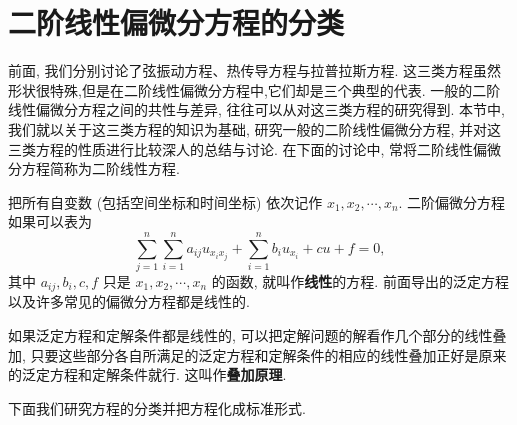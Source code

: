 \section{二阶线性偏微分方程的分类}
前面, 我们分别讨论了弦振动方程、热传导方程与拉普拉斯方程.
这三类方程虽然形状很特殊,但是在二阶线性偏微分方程中,它们却是三个典型的代表.
一般的二阶线性偏微分方程之间的共性与差异, 往往可以从对这三类方程的研究得到.
本节中, 我们就以关于这三类方程的知识为基础, 
研究一般的二阶线性偏微分方程, 并对这三类方程的性质进行比较深人的总结与讨论. 
在下面的讨论中, 常将二阶线性偏微分方程简称为二阶线性方程.

把所有自变数 (包括空间坐标和时间坐标) 依次记作 $x_1, x_2, \cdots, x_n$. 二阶偏微分方程如果可以表为
\begin{equation}
    \sum_{j=1}^n \sum_{i=1}^n a_{i j} u_{x_i x_j}+\sum_{i=1}^n b_i u_{x_i}+c u+f=0,
    \label{eq:general_2nd_order_diff_equation}
\end{equation} 
其中 $a_{i j}, b_i, c, f$ 只是 $x_1, x_2, \cdots, x_n$ 的函数, 就叫作\textbf{线性}的方程. 
前面导出的泛定方程以及许多常见的偏微分方程都是线性的.


如果泛定方程和定解条件都是线性的, 可以把定解问题的解看作几个部分的线性叠加,
 只要这些部分各自所满足的泛定方程和定解条件的相应的线性叠加正好是原来的泛定方程和定解条件就行. 
 这叫作\textbf{叠加原理}. 

 下面我们研究方程的分类并把方程化成标准形式.
